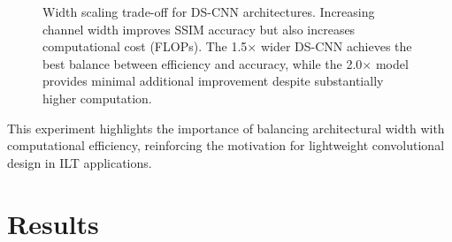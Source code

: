 \documentclass[conference]{IEEEtran}
\begin{document}

\begin{figure}[!t]
\centering


\caption{Width scaling trade-off for DS-CNN architectures. Increasing channel width improves SSIM accuracy but also increases computational cost (FLOPs). The 1.5$\times$ wider DS-CNN achieves the best balance between efficiency and accuracy, while the 2.0$\times$ model provides minimal additional improvement despite substantially higher computation.}
\label{fig:width_scaling_tradeoff}

\end{figure}



This experiment highlights the importance of balancing architectural width with computational efficiency, reinforcing the motivation for lightweight convolutional design in ILT applications.




















\section{\textbf{Results}}
\end{document}
